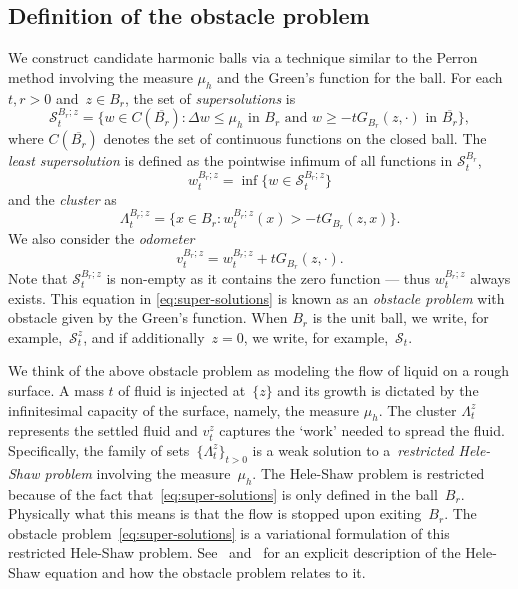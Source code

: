 \documentclass[12pt]{amsart}
\numberwithin{equation}{section}
\newcommand{\mclS}[2]{\hyperref[eq:super-solutions]{\mathcal{S}^{#1}_{#2}}}
\newcommand{\lss}[2]{\hyperref[eq:least-super-solution]{w^{#1}_{#2}}}
\newcommand{\cluster}[2]{\hyperref[eq:non-co-set]{\mathit{\Lambda}^{#1}_{#2}}}
\newcommand{\odometer}[2]{\hyperref[eq:limit-odometer]{v^{#1}_{#2}}}
\begin{document}
	\subsection{Definition of the obstacle problem} \label{subsec:obstacle-def} 
	We construct candidate harmonic balls via a technique similar to the Perron method involving the measure $\mu_h$ and the Green's function for the ball.
	For each $t, r > 0$ and~$z \in B_r$,  the set of {\it supersolutions}
	is 
	\begin{equation} \label{eq:super-solutions}
	\mclS{B_r; z}{t}  = \{ w \in C(\overline{B_r}) :  \Delta w \leq \mu_h \mbox{ in $B_r$}  \mbox{ and }  w \geq  -t G_{B_r}(z, \cdot) \mbox{ in $\overline{B_r}$}\},
	\end{equation}
	where $C(\overline{B_r})$ denotes the set of continuous functions on the closed ball.
	The {\it least supersolution} is defined as the pointwise infimum of all functions in $\mclS{B_r}{t}$, 
	\begin{equation} \label{eq:least-super-solution}
	\lss{B_r; z}{t} = \inf\{ w \in \mclS{B_r;z }{t} \}
	\end{equation}
	and the {\it cluster} as
	\begin{equation} \label{eq:non-co-set}
	\cluster{B_r; z}{t} = \{ x \in B_r : \lss{B_r; z}{t}(x) > -t G_{B_r}(z, x) \}. %
	\end{equation}
	We also consider the {\it odometer}	
	\begin{equation} \label{eq:limit-odometer}
	\odometer{B_r; z}{t} = \lss{B_r; z}{t}  + t G_{B_r}(z, \cdot). %
	\end{equation}
	Note that $\mclS{B_r; z}{t}$ is non-empty as it contains the zero function --- thus $\lss{B_r; z}{t}$ always exists.
	This equation in \eqref{eq:super-solutions} is known as an {\it obstacle problem} with obstacle given by the Green's function.
	When $B_r$ is the unit ball, we write, for example,~$\mclS{z}{t}$, and if additionally~$z = 0$, we write, for example,~$\mclS{}{t}$.
	
	
	We think of the above obstacle problem as modeling the flow of liquid on a rough surface. 
	A mass $t$ of fluid is injected at~$\{z\}$ and its growth is dictated by the infinitesimal capacity of the surface, namely, the measure $\mu_h$. The cluster ${\cluster{z}{t}}$ represents the settled fluid and $\odometer{z}{t}$ captures the `work' needed to spread the fluid. Specifically, the family of sets~$\{{\cluster{z}{t}}\}_{t > 0}$ is a weak solution 
	to a~\emph{restricted Hele-Shaw problem} involving the measure~$\mu_h$. The Hele-Shaw problem is restricted because 
	of the fact that~\eqref{eq:super-solutions} is only defined in the ball~$B_r$. Physically what this means is that the flow is stopped upon exiting~$B_r$. The obstacle problem~\eqref{eq:super-solutions}
	is a variational formulation of this restricted Hele-Shaw problem.  See~\cite[Section 3.5]{gustafsson2006conformal} and~\cite{roos2016partial} for an explicit description of the Hele-Shaw equation and how the obstacle problem relates to it. 
	
\end{document}
